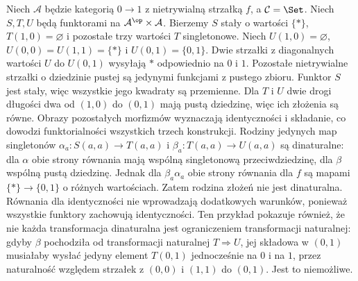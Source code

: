 \begin{przyklad}\label{cat:ex:dinatural-noncomposition}
Niech $\mathcal A$ będzie kategorią $0\to1$ z nietrywialną strzałką $f$, a $\mathcal C=\Set$. Niech $S,T,U$ będą funktorami na $\mathcal A^{\op}\times\mathcal A$. Bierzemy $S$ stały o wartości $\{*\}$, $T(1,0)=\varnothing$ i pozostałe trzy wartości $T$ singletonowe. Niech $U(1,0)=\varnothing$, $U(0,0)=U(1,1)=\{*\}$ i $U(0,1)=\{0,1\}$. Dwie strzałki z diagonalnych wartości $U$ do $U(0,1)$ wysyłają $*$ odpowiednio na $0$ i $1$. Pozostałe nietrywialne strzałki o dziedzinie pustej są jedynymi funkcjami z pustego zbioru. Funktor $S$ jest stały, więc wszystkie jego kwadraty są przemienne. Dla $T$ i $U$ dwie drogi długości dwa od $(1,0)$ do $(0,1)$ mają pustą dziedzinę, więc ich złożenia są równe. Obrazy pozostałych morfizmów wyznaczają identyczności i składanie, co dowodzi funktorialności wszystkich trzech konstrukcji.
Rodziny jedynych map singletonów $\alpha_a:S(a,a)\to T(a,a)$ i $\beta_a:T(a,a)\to U(a,a)$ są dinaturalne: dla $\alpha$ obie strony równania mają wspólną singletonową przeciwdziedzinę, dla $\beta$ wspólną pustą dziedzinę. Jednak dla $\beta_a\alpha_a$ obie strony równania dla $f$ są mapami $\{*\}\to\{0,1\}$ o różnych wartościach. Zatem rodzina złożeń nie jest dinaturalna. Równania dla identyczności nie wprowadzają dodatkowych warunków, ponieważ wszystkie funktory zachowują identyczności. Ten przykład pokazuje również, że nie każda transformacja dinaturalna jest ograniczeniem transformacji naturalnej: gdyby $\beta$ pochodziła od transformacji naturalnej $T\Rightarrow U$, jej składowa w $(0,1)$ musiałaby wysłać jedyny element $T(0,1)$ jednocześnie na $0$ i na $1$, przez naturalność względem strzałek z $(0,0)$ i $(1,1)$ do $(0,1)$. Jest to niemożliwe.
\end{przyklad}

